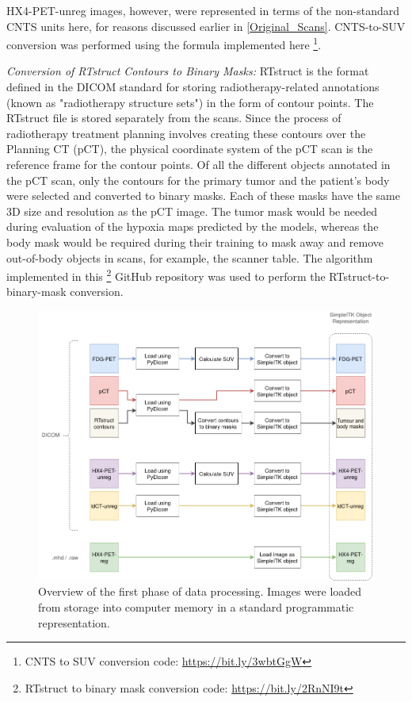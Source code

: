 HX4-PET-unreg images, however, were represented in terms of the non-standard CNTS units here, for reasons discussed earlier in \ref{Original_Scans}. CNTS-to-SUV conversion was performed using the formula implemented here \footnote{CNTS to SUV conversion code: \url{https://bit.ly/3wbtGgW}}.

\vspace{4mm}
\noindent
\textit{Conversion of RTstruct Contours to Binary Masks:} RTstruct is the format defined in the DICOM standard for storing radiotherapy-related annotations (known as "radiotherapy structure sets") in the form of contour points. The RTstruct file is stored separately from the scans. Since the process of radiotherapy treatment planning involves creating these contours over the Planning CT (pCT), the physical coordinate system of the pCT scan is the reference frame for the contour points. Of all the different objects annotated in the pCT scan, only the contours for the primary tumor and the patient's body were selected and converted to binary masks. Each of these masks have the same 3D size and resolution as the pCT image. The tumor mask would be needed during evaluation of the hypoxia maps predicted by the models, whereas the body mask would be required during their training to mask away and remove out-of-body objects in scans, for example, the scanner table. The algorithm implemented in this \footnote{RTstruct to binary mask conversion code: \url{https://bit.ly/2RnNI9t}} GitHub repository was used to perform the RTstruct-to-binary-mask conversion.

\begin{figure}[h!]
    \centering
    \includegraphics[width=0.9\linewidth]{figures/Data/data_processing_overview-step_1.png}
    \caption{Overview of the first phase of data processing. Images were loaded from storage into computer memory in a standard programmatic representation.}
    \label{fig:data_proc_overview_1}
\end{figure}

